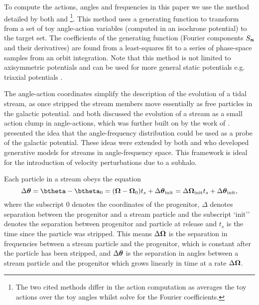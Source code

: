\documentclass[useAMS,usenatbib,fleqn,a4paper]{mn2e}
\newcommand{\bs}[1]{\bmath{#1}}
\begin{document}
To compute the actions, angles and frequencies in this paper we use the method detailed by both \cite{SandersBinney2014} and \cite{Bovy2014}\footnote{The two cited methods differ in the action computation as \cite{Bovy2014} averages the toy actions over the toy angles whilst \cite{SandersBinney2014} solve for the Fourier coefficients.}. This method uses a generating function to transform from a set of toy angle-action variables (computed in an isochrone potential) to the target set. The coefficients of the generating function (Fourier components $S_{\bs{n}}$ and their derivatives) are found from a least-squares fit to a series of phase-space samples from an orbit integration. Note that this method is not limited to axisymmetric potentials and can be used for more general static potentials e.g. triaxial potentials \citep[see][]{SandersBinney2014}.

The angle-action coordinates simplify the description of the evolution of a tidal stream, as once stripped the stream members move essentially as free particles in the galactic potential. \cite{HelmiWhite1999} and \cite{Tremaine1999} both discussed the evolution of a stream as a small action clump in angle-actions, which was further built on by the work of \cite{EyreBinney2011}. \cite{SandersBinney2013b} presented the idea that the angle-frequency distribution could be used as a probe of the galactic potential. These ideas were extended by both \cite{Bovy2014} and \cite{Sanders2014} who developed generative models for streams in angle-frequency space. This framework is ideal for the introduction of velocity perturbations due to a subhalo.

Each particle in a stream obeys the equation
\begin{equation}\label{linearevol}
\Delta\bs{\theta} = \btheta-\btheta_0 = (\boldsymbol{\Omega}-\boldsymbol{\Omega}_0)t_s +\Delta\bs{\theta}_\mathrm{init}= \Delta\bs{\Omega}_\mathrm{init}t_s+\Delta\bs{\theta}_\mathrm{init},
\end{equation}
where the subscript $0$ denotes the coordinates of the progenitor, $\Delta$ denotes separation between the progenitor and a stream particle and the subscript `$\mathrm{init}$'' denotes the separation between progenitor and particle at release and $t_s$ is the time since the particle was stripped. This means $\Delta\bs{\Omega}$ is the separation in frequencies between a stream particle and the progenitor, which is constant after the particle has been stripped, and $\Delta\bs{\theta}$ is the separation in angles between a stream particle and the progenitor which grows linearly in time at a rate $\Delta\bs{\Omega}$.
\end{document}
